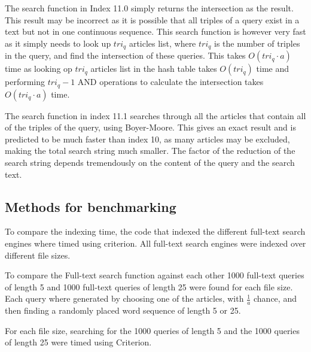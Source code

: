 The search function in Index 11.0 simply returns the intersection as the result. This result may be incorrect as it is possible that all triples of a query exist in a text but not in one continuous sequence. This search function is however very fast as it simply needs to look up $tri_q$ articles list, where $tri_q$ is the number of triples in the query, and find the intersection of these queries. This takes $O(tri_q\cdot a)$ time as looking op $tri_q$ articles list in the hash table takes $O(tri_q)$ time and performing $tri_q - 1 $ AND operations to calculate the intersection takes $O(tri_q\cdot a)$ time.

The search function in index 11.1 searches through all the articles that contain all of the triples of the query, using Boyer-Moore. This gives an exact result and is predicted to be much faster than index 10, as many articles may be excluded, making the total search string much smaller. The factor of the reduction of the search string depends tremendously on the content of the query and the search text.


\subsection{Methods for benchmarking}
To compare the indexing time, the code that indexed the different full-text search engines where timed using criterion. All full-text search engines were indexed over different file sizes.

To compare the Full-text search function against each other 1000 full-text queries of length 5 and 1000 full-text queries of length 25  were found for each file size. Each query where generated by choosing one of the articles, with $\frac{1}{a}$ chance, and then finding a randomly placed word sequence of length 5 or 25. 

For each file size, searching for the 1000 queries of length 5 and the 1000 queries of length 25 were timed using Criterion.





